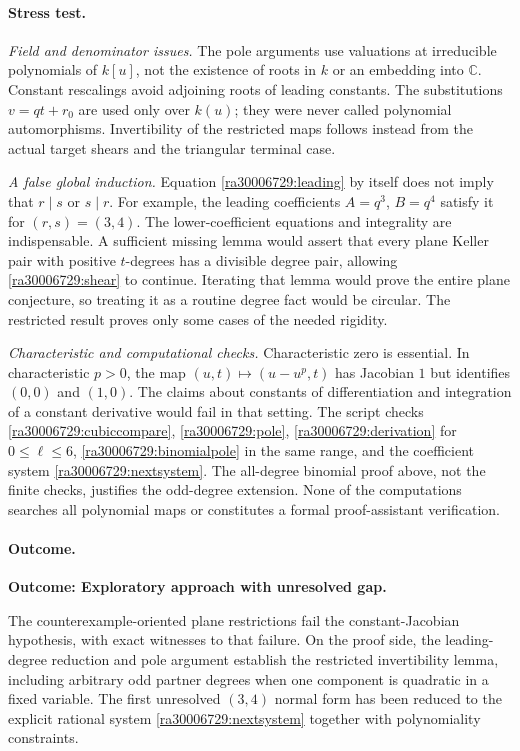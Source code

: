 \documentclass[11pt]{article}
\newcommand{\C}{\mathbb{C}}
\begin{document}
\paragraph{Stress test.}
\emph{Field and denominator issues.}
The pole arguments use valuations at irreducible polynomials of $k[u]$,
not the existence of roots in $k$ or an embedding into $\C$. Constant
rescalings avoid adjoining roots of leading constants. The substitutions
$v=qt+r_0$ are used only over $k(u)$; they were never called polynomial
automorphisms. Invertibility of the restricted maps follows instead from
the actual target shears and the triangular terminal case.

\emph{A false global induction.}
Equation \eqref{ra30006729:leading} by itself does not imply that $r\mid s$ or
$s\mid r$. For example, the leading coefficients $A=q^3$, $B=q^4$
satisfy it for $(r,s)=(3,4)$. The lower-coefficient equations and integrality
are indispensable. A sufficient missing lemma would assert that every plane
Keller pair with positive $t$-degrees has a divisible degree pair, allowing
\eqref{ra30006729:shear} to continue. Iterating that lemma would prove the entire
plane conjecture, so treating it as a routine degree fact would be circular.
The restricted result proves only some cases of the needed rigidity.

\emph{Characteristic and computational checks.}
Characteristic zero is essential. In characteristic $p>0$, the map
$(u,t)\mapsto(u-u^p,t)$ has Jacobian $1$ but identifies $(0,0)$ and $(1,0)$.
The claims about constants of differentiation and integration of a constant
derivative would fail in that setting. The script checks
\eqref{ra30006729:cubiccompare}, \eqref{ra30006729:pole},
\eqref{ra30006729:derivation} for $0\le\ell\le6$,
\eqref{ra30006729:binomialpole} in the same range, and the coefficient system
\eqref{ra30006729:nextsystem}. The all-degree binomial proof above, not the finite
checks, justifies the odd-degree extension. None of the computations searches
all polynomial maps or constitutes a formal proof-assistant verification.

\paragraph{Outcome.}
\textbf{Outcome: Exploratory approach with unresolved gap.}

The counterexample-oriented plane restrictions fail the constant-Jacobian
hypothesis, with exact witnesses to that failure. On the proof side, the
leading-degree reduction and pole argument establish the restricted
invertibility lemma, including arbitrary odd partner degrees when one
component is quadratic in a fixed variable. The first unresolved $(3,4)$
normal form has been reduced to the explicit rational system
\eqref{ra30006729:nextsystem} together with polynomiality constraints.
\end{document}
